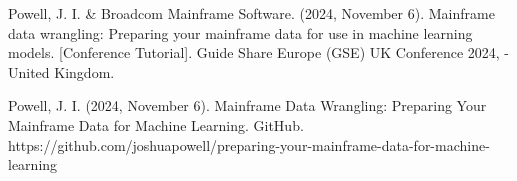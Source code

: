 \documentclass[a4paper]{article}
\begin{document}
\begin{thebibliography}{11}
    \bibitem[14]{}
    Powell, J. I. \& Broadcom Mainframe Software. (2024, November 6). Mainframe data wrangling: Preparing your mainframe data for use in machine learning models. [Conference Tutorial]. Guide Share Europe (GSE) UK Conference 2024, - United Kingdom.

    \bibitem[15]{}
    Powell, J. I. (2024, November 6). Mainframe Data Wrangling: Preparing Your Mainframe Data for Machine Learning. GitHub. https://github.com/joshuapowell/preparing-your-mainframe-data-for-machine-learning
    
\end{thebibliography}


\end{document}
